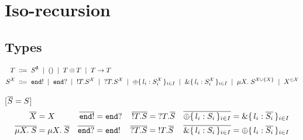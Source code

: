 \section{Iso-recursion}

\subsection{Types}

\begin{align*}
  T \grmdef&
    S^\emptyset               \grmor
    \TUnit          \grmor
    \TPair T T      \grmor
    \TFun  T T      \\
  S^{\mathcal X} \grmdef&
    \TEnd !         \grmor
    \TEnd ?         \grmor
    \TOut T S^{\mathcal X}       \grmor
    \TIn  T S^{\mathcal X}       \grmor
    \TSelect{ l_i: S^{\mathcal X}_i } \grmor
    \TCase{ l_i: S^{\mathcal X}_i }   \grmor
    \TRec[X] S^{\mathcal X \cup \{X\}}      \grmor
    X^{\in \mathcal X}
\end{align*}

[$\TDual S = S$]
\begin{align*}
  \TDual X &= X                               &
  \TDual{\TEnd !} &= \TEnd ?                  &
  \TDual{\TOut T S} &= \TIn T \TDual{S}       &
  \TDual{\TSelect{ l_i: S_i }} &=
    \TCase{ l_i: \TDual{S_i} }                \\
  \TDual{\TRec S} &= \TRec{\TDual S}          &
  \TDual{\TEnd ?} &= \TEnd !                  &
  \TDual{\TIn T S} &= \TOut T \TDual{S}       &
  \TDual{\TCase{ l_i: S_i }} &=
    \TSelect{ l_i: \TDual{S_i} }
\end{align*}

% 

